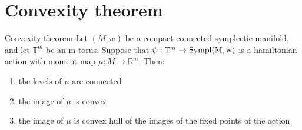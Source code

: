 \documentclass{beamer}
\def\R{\mathbb{R}}
\def\T{\mathbb{T}}
\def\Sympl{\rm Sympl}
\begin{document}
\section{Convexity theorem}
\begin{frame}{Convexity theorem}
    Let $(M, w)$ be a compact connected symplectic manifold, and let $\T^m$ be an m-torus. Suppose that $\psi: \T^m \to \Sympl (M,w)$ is a hamiltonian action with moment map $\mu: M \to \R^m$. Then:
    \begin{enumerate}
        \item the levels of $\mu$ are connected
        \item the image of $\mu$ is convex
        \item the image of $\mu$ is convex hull of the images of the fixed points of the action
    \end{enumerate}

\end{frame}
\end{document}

